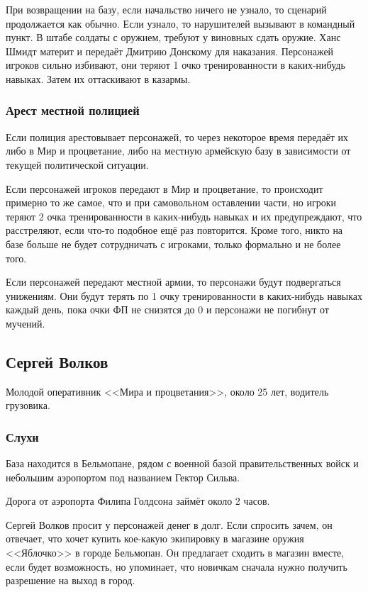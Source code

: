 \documentclass{article}
\begin{document}
При возвращении на базу, если начальство ничего не узнало, то сценарий
продолжается как обычно. Если узнало, то нарушителей вызывают в
командный пункт. В штабе солдаты с оружием, требуют у виновных сдать
оружие. Ханс Шмидт материт и передаёт Дмитрию Донскому для наказания.
Персонажей игроков сильно избивают, они теряют 1 очко тренированности в
каких-нибудь навыках. Затем их оттаскивают в казармы.

\subsubsection{Арест местной
полицией}\label{police-arrest}

Если полиция арестовывает персонажей, то через некоторое время передаёт
их либо в Мир и процветание, либо на местную армейскую базу в
зависимости от текущей политической ситуации.

Если персонажей игроков передают в Мир и процветание, то происходит
примерно то же самое, что и при самовольном оставлении части, но игроки
теряют 2 очка тренированности в каких-нибудь навыках и их предупреждают,
что расстреляют, если что-то подобное ещё раз повторится. Кроме того,
никто на базе больше не будет сотрудничать с игроками, только формально
и не более того.

Если персонажей передают местной армии, то персонажи будут подвергаться
унижениям. Они будут терять по 1 очку тренированности в каких-нибудь
навыках каждый день, пока очки ФП не снизятся до 0 и персонажи не
погибнут от мучений.

\subsection{Сергей
Волков}\label{sergei-volkov}

Молодой оперативник <<Мира и процветания>>, около 25 лет, водитель
грузовика.

\subsubsection{Слухи}\label{rumors-volkov}

База находится в Бельмопане, рядом с военной базой правительственных
войск и небольшим аэропортом под названием Гектор Сильва.

Дорога от аэропорта Филипа Голдсона займёт около 2 часов.

Сергей Волков просит у персонажей денег в долг. Если спросить зачем, он
отвечает, что хочет купить кое-какую экипировку в магазине оружия
<<Яблочко>> в городе Бельмопан. Он предлагает сходить в магазин вместе,
если будет возможность, но упоминает, что новичкам сначала нужно
получить разрешение на выход в город.
\end{document}
